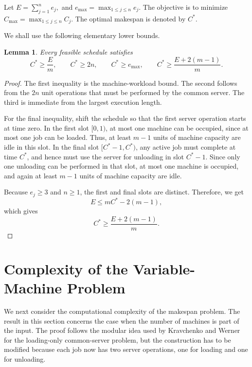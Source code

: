 \documentclass[11pt]{article}
\newtheorem{lemma}[theorem]{Lemma}
\begin{document}
Let
$ E=\sum_{j=1}^{n}e_j,$ and $e_{\max}=\max_{1\le j\le n}e_j.$ The objective is to minimize
$C_{\max}=\max_{1\le j\le n}C_j.$ The optimal makespan is denoted by \(C^*\).

We shall use the following elementary lower bounds.

\begin{lemma}
\label{lem:lower-bounds}
Every feasible schedule satisfies
\[
        C^*\ge \frac{E}{m},
        \qquad
        C^*\ge 2n,
        \qquad
        C^*\ge e_{\max},
        \qquad
        C^*\ge \frac{E+2(m-1)}{m}.
\]
\end{lemma}

\begin{proof}
The first inequality is the machine-workload bound. The second follows from the
\(2n\) unit operations that must be performed by the common server. The third is
immediate from the largest execution length.

For the final inequality, shift the schedule so that the first server operation
starts at time zero. In the first slot \([0,1)\), at most one machine can be
occupied, since at most one job can be loaded. Thus, at least \(m-1\) units of
machine capacity are idle in this slot. In the final slot \([C^*-1,C^*)\), any
active job must complete at time \(C^*\), and hence must use the server for
unloading in slot \(C^*-1\). Since only one unloading can be performed in that
slot, at most one machine is occupied, and again at least \(m-1\) units of
machine capacity are idle.

Because \(e_j\ge3\) and \(n\ge1\), the first and final slots are distinct.
Therefore, we get
\[
        E\le mC^*-2(m-1),
\]
which gives
\[
        C^*\ge \frac{E+2(m-1)}{m}.
\]
\end{proof}


\section{Complexity of the Variable-Machine Problem}
\label{sec:complexity-variable-m}

We next consider the computational complexity of the makespan problem. The
result in this section concerns the case when the number of machines is part of
the input. The proof follows the modular idea used by Kravchenko and Werner for
the loading-only common-server problem, but the construction has to be modified
because each job now has two server operations, one for loading and one for
unloading.
\end{document}
